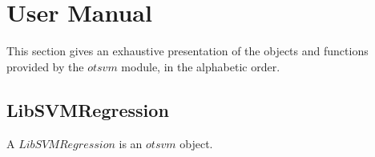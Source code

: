 % 

\section{User Manual}

This section gives an exhaustive presentation of the objects and functions provided by the $otsvm$ module, in the alphabetic order.


\subsection{LibSVMRegression}

A $LibSVMRegression$ is an $otsvm$ object.

